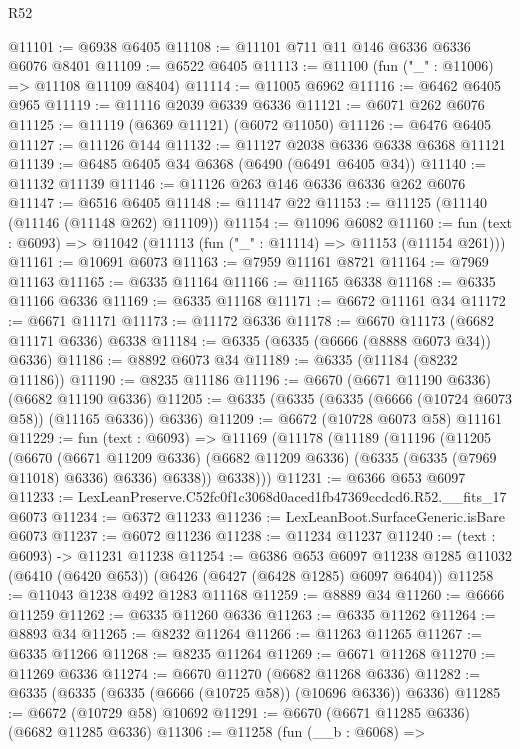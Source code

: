 \begin{lexlean}{R52}
\begin{coremodule}
@11101 := @6938 @6405
@11108 := @11101 @711 @11 @146 @6336 @6336 @6076 @8401
@11109 := @6522 @6405
@11113 := @11100 (fun ("_" : @11006) => @11108 @11109 @8404)
@11114 := @11005 @6962
@11116 := @6462 @6405 @965
@11119 := @11116 @2039 @6339 @6336
@11121 := @6071 @262 @6076
@11125 := @11119 (@6369 @11121) (@6072 @11050)
@11126 := @6476 @6405
@11127 := @11126 @144
@11132 := @11127 @2038 @6336 @6338 @6368 @11121
@11139 := @6485 @6405 @34 @6368 (@6490 (@6491 @6405 @34))
@11140 := @11132 @11139
@11146 := @11126 @263 @146 @6336 @6336 @262 @6076
@11147 := @6516 @6405
@11148 := @11147 @22
@11153 := @11125 (@11140 (@11146 (@11148 @262) @11109))
@11154 := @11096 @6082
@11160 := fun (text : @6093) => @11042 (@11113 (fun ("_" : @11114) => @11153 (@11154 @261)))
@11161 := @10691 @6073
@11163 := @7959 @11161 @8721
@11164 := @7969 @11163
@11165 := @6335 @11164
@11166 := @11165 @6338
@11168 := @6335 @11166 @6336
@11169 := @6335 @11168
@11171 := @6672 @11161 @34
@11172 := @6671 @11171
@11173 := @11172 @6336
@11178 := @6670 @11173 (@6682 @11171 @6336) @6338
@11184 := @6335 (@6335 (@6666 (@8888 @6073 @34)) @6336)
@11186 := @8892 @6073 @34
@11189 := @6335 (@11184 (@8232 @11186))
@11190 := @8235 @11186
@11196 := @6670 (@6671 @11190 @6336) (@6682 @11190 @6336)
@11205 := @6335 (@6335 (@6335 (@6666 (@10724 @6073 @58)) (@11165 @6336)) @6336)
@11209 := @6672 (@10728 @6073 @58) @11161
@11229 := fun (text : @6093) =>
  @11169
    (@11178
      (@11189
        (@11196
          (@11205
            (@6670
              (@6671 @11209 @6336)
              (@6682 @11209 @6336)
              (@6335 (@6335 (@7969 @11018) @6336) @6336)
              @6338))
          @6338)))
@11231 := @6366 @653 @6097
@11233 := LexLeanPreserve.C52fc0f1c3068d0aced1fb47369ccdcd6.R52.__fits_17 @6073
@11234 := @6372 @11233
@11236 := LexLeanBoot.SurfaceGeneric.isBare @6073
@11237 := @6072 @11236
@11238 := @11234 @11237
@11240 := (text : @6093) -> @11231 @11238
@11254 := @6386
    @653
    @6097
    @11238
    @1285
    @11032
    (@6410 (@6420 @653))
    (@6426 (@6427 (@6428 @1285) @6097 @6404))
@11258 := @11043 @1238 @492 @1283 @11168
@11259 := @8889 @34
@11260 := @6666 @11259
@11262 := @6335 @11260 @6336
@11263 := @6335 @11262
@11264 := @8893 @34
@11265 := @8232 @11264
@11266 := @11263 @11265
@11267 := @6335 @11266
@11268 := @8235 @11264
@11269 := @6671 @11268
@11270 := @11269 @6336
@11274 := @6670 @11270 (@6682 @11268 @6336)
@11282 := @6335 (@6335 (@6335 (@6666 (@10725 @58)) (@10696 @6336)) @6336)
@11285 := @6672 (@10729 @58) @10692
@11291 := @6670 (@6671 @11285 @6336) (@6682 @11285 @6336)
@11306 := @11258
    (fun (__b : @6068) =>

\end{coremodule}
\end{lexlean}
